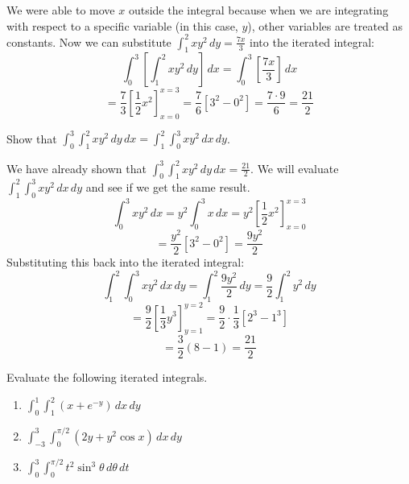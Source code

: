 We were able to move $x$ outside the integral because when we are integrating 
with respect to a specific variable (in this case, $y$), other variables are 
treated as constants. Now we can substitute $\int_1^2 xy^2 \,dy = \frac{7x}{3}$
into the iterated integral:
$$\int_0^3 \left[ \int_1^2 x y^2\,dy \right]\,dx = \int_0^3 \left[ \frac{7x}{3}
\right]\,dx$$
$$= \frac{7}{3} \left[ \frac{1}{2}x^2 \right]_{x = 0}^{x = 3} = \frac{7}{6} 
\left[ 3^2 - 0^2 \right] = \frac{7 \cdot 9}{6} = \frac{21}{2}$$

\begin{Exercise}[title = {Order of Evaluating Iterated Integrals}, label = 
iterate 1]
Show that $\int_0^3 \int_1^2 x y^2\,dy\,dx = \int_1^2 \int_0^3 x y^2 \,dx\,dy$.
\end{Exercise}

\begin{Answer}[ref = iterate_1]
We have already shown that $\int_0^3 \int_1^2 x y^2\,dy\,dx = \frac{21}{2}$. 
We will evaluate $\int_1^2 \int_0^3 x y^2 \,dx\,dy$ and see if we get the same 
result. 
$$\int_0^3 x y^2 \,dx = y^2 \int_0^3 x\,dx = y^2 \left[ \frac{1}{2}x^2 \right]_
{x = 0}^{x = 3}$$
$$= \frac{y^2}{2} \left[ 3^2 - 0^2 \right] = \frac{9y^2}{2}$$
Substituting this back into the iterated integral:
$$\int_1^2 \int_0^3 x y^2 \,dx\,dy = \int_1^2 \frac{9y^2}{2}\,dy = \frac{9}{2} 
\int_1^2 y^2 \,dy$$
$$= \frac{9}{2} \left[ \frac{1}{3}y^3 \right]_{y = 1}^{y = 2} = \frac{9}{2} 
\cdot \frac{1}{3} \left[ 2^3 - 1^3 \right]$$
$$= \frac{3}{2}(8 - 1) = \frac{21}{2}$$
\end{Answer}

\begin{Exercise}[title = {Evaluating Iterated Integrals}, label = iterate_2]
Evaluate the following iterated integrals.
\begin{enumerate}
\item $\int_0^1 \int_1^2 \left( x + e^{-y} \right)\,dx\,dy$
\item $\int_{-3}^3 \int_{0}^{\pi/2} \left( 2y + y^2 \cos{x} \right)\,dx\,dy$
\item $\int_0^3 \int_0^{\pi/2} t^2 \sin^3{\theta}\,d\theta\,dt$
\end{enumerate}
\vspace{100mm}
\end{Exercise}

